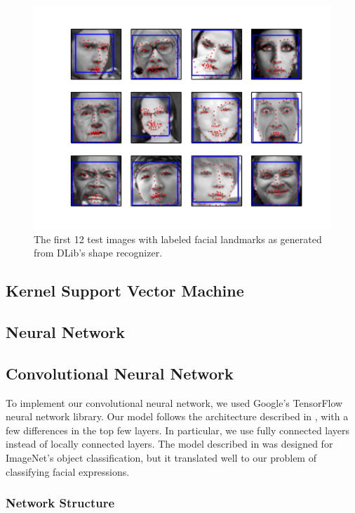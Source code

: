 \documentclass[11pt, twocolumn, twoside]{article}
\begin{document}
\begin{figure}
\centering
\includegraphics[width=\textwidth]{landmarks}
\caption{\label{fig:landmarks} The first 12 test images with labeled facial landmarks
as generated from DLib's shape recognizer.}
\end{figure}

\subsection{Kernel Support Vector Machine}

\subsection{Neural Network}

\subsection{Convolutional Neural Network}

To implement our convolutional neural network, we used Google's TensorFlow neural network library.
Our model follows the architecture described in \cite{Krizhevsky}, with a few differences in the top few layers.
In particular, we use fully connected layers instead of locally connected layers. The model described in
\cite{Krizhevsky} was designed for ImageNet's object classification, but it translated well to our problem of classifying facial expressions.

\subsubsection{Network Structure}
\end{document}
